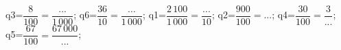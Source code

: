 \documentclass[exercice]{thedocument}%
\begin{document}
%
    \>q3=$\dfrac8{100}=\dfrac{...}{1\,000}$;%
    \>q6=$\dfrac{36}{10}=\dfrac{...}{1\,000}$;%
    \>q1=$\dfrac{2\,100}{1\,000}=\dfrac{...}{10}$;%
    \>q2=$\dfrac{900}{100}=...$;%
    \>q4=$\dfrac{30}{100}=\dfrac{3}{...}$;%
    \>q5=$\dfrac{67}{100}=\dfrac{67\,000}{...}$;%
\end{document}

